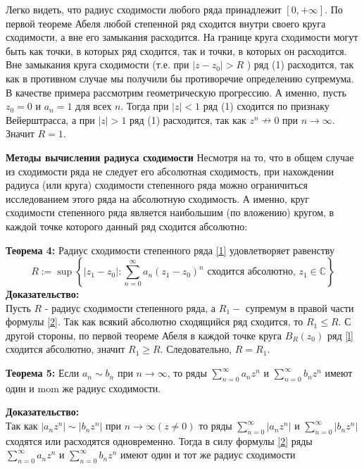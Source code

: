 \documentclass[a4paper,12pt]{article} %
\begin{document}
Легко видеть, что радиус сходимости любого ряда принадлежит $[0,+\infty]$. По первой теореме Абеля любой степенной ряд сходится внутри своего круга сходимости, а вне его замыкания расходится. На границе круга сходимости могут быть как точки, в которых ряд сходится, так и точки, в которых он расходится. Вне замыкания круга сходимости (т.е. при $\left|z-z_{0}\right|>R$ ) ряд (1) расходится, так как в противном случае мы получили бы противоречие определению супремума. В качестве примера рассмотрим геометрическую прогрессию. А именно, пусть $z_{0}=0$ и $a_{n}=1$ для всех $n$. Тогда при $|z|<1$ ряд (1) сходится по признаку Вейерштрасса, а при $|z|>1$ ряд (1) расходится, так как $z^{n} \nrightarrow 0$ при $n \rightarrow \infty$. Значит $R=1$.

\textbf{Методы вычисления радиуса сходимости}
Несмотря на то, что в общем случае из сходимости ряда не следует его абсолютная сходимость, при нахождении радиуса (или круга) сходимости степенного ряда можно ограничиться исследованием этого ряда на абсолютную сходимость. А именно, круг сходимости степенного ряда является наибольшим (по вложению) кругом, в каждой точке которого данный ряд сходится абсолютно:

\textbf{Теорема 4:} Радиус сходимости степенного ряда \eqref{1} удовлетворяет равенству
\begin{equation}\label{2}
R:=\sup \left\{\left|z_{1}-z_{0}\right|: \sum_{n=0}^{\infty} a_{n}\left(z_{1}-z_{0}\right)^{n} \text { сходится абсолютно, } z_{1} \in \mathbb{C}\right\}
\end{equation}
\textbf{Доказательство:}\\
Пусть $R$ - радиус сходимости степенного ряда, а $R_{1}-$ супремум в правой части формулы \eqref{2}. Так как всякий абсолютно сходящийся ряд сходится, то $R_{1} \leq R$. С другой стороны, по первой теореме Абеля в каждой точке круга $B_{R}\left(z_{0}\right)$ ряд \eqref{l} сходится абсолютно, значит $R_{1} \geq R$. Следовательно, $R=R_{1}$.

\textbf{Теорема 5:} Если $a_{n} \sim b_{n}$ при $n \rightarrow \infty$, то ряды $\sum_{n=0}^{\infty} a_{n} z^{n}$ и $\sum_{n=0}^{\infty} b_{n} z^{n}$ имеют один и mom же радиус сходимости.

\textbf{Доказательство:}\\
Так как $\left|a_{n} z^{n}\right| \sim\left|b_{n} z^{n}\right|$ при $n \rightarrow \infty(z \neq 0)$ то ряды $\sum_{n=0}^{\infty}\left|a_{n} z^{n}\right|$ и $\sum_{n=0}^{\infty}\left|b_{n} z^{n}\right|$ сходятся или расходятся одновременно. Тогда в силу формулы \eqref{2} ряды $\sum_{n=0}^{\infty} a_{n} z^{n}$ и $\sum_{n=0}^{\infty} b_{n} z^{n}$ имеют один и тот же радиус сходимости
\end{document}
